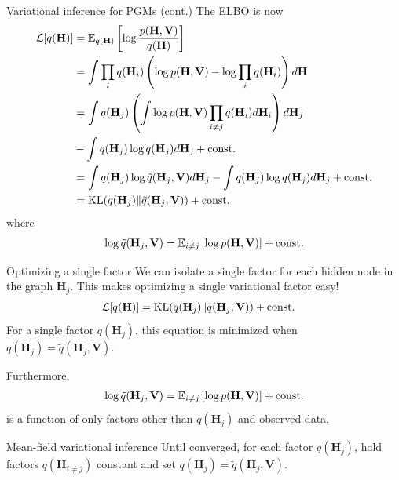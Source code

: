 \documentclass[10pt, compress]{beamer}
\begin{document}
\begin{frame}{Variational inference for PGMs (cont.)}
	The ELBO is now
	\begin{align*}
		\mathcal{L}[q(\mathbf{H})] &= \mathbb{E}_{q(\mathbf{H})} \left[\log\frac{p(\mathbf{H}, \mathbf{V})}{q(\mathbf{H})}\right] \\
											&= \int\prod_i q(\mathbf{H}_i) \left(\log p(\mathbf{H}, \mathbf{V}) - \log \prod_i q(\mathbf{H}_i)\right)d\mathbf{H}\\
											&= \int q(\mathbf{H}_j) \left(\int \log p(\mathbf{H}, \mathbf{V})\prod_{i \neq j}q(\mathbf{H}_i)d\mathbf{H}_i \right)d\mathbf{H}_j \\&- \int q(\mathbf{H}_j)\log q(\mathbf{H}_j)d \mathbf{H}_j + \textrm{const.}\\
											&= \int q(\mathbf{H}_j)\log \tilde{q}(\mathbf{H}_j, \mathbf{V})d \mathbf{H}_j- \int q(\mathbf{H}_j)\log q(\mathbf{H}_j)d \mathbf{H}_j  + \textrm{const.} \\
											&= \textrm{KL}(q(\mathbf{H}_j)\|\tilde{q}(\mathbf{H}_j, \mathbf{V}))  + \textrm{const.}
	\end{align*}
	where 
	\begin{align*}
		\log\tilde{q}(\mathbf{H}_j, \mathbf{V}) = \mathbb{E}_{i \neq j}\left[\log p(\mathbf{H}, \mathbf{V})\right] + \textrm{const.}
	\end{align*}

\end{frame}

\begin{frame}{Optimizing a single factor}
	We can isolate a single factor for each hidden node in the graph $\mathbf{H}_j$.
	This makes optimizing a single variational factor easy!
	\pause
	\begin{align*}
		\mathcal{L}[q(\mathbf{H})] &= \textrm{KL}(q(\mathbf{H}_j)\|\tilde{q}(\mathbf{H}_j, \mathbf{V}))  + \textrm{const.}
	\end{align*}
	\pause
	For a single factor $q(\mathbf{H}_j)$, this equation is minimized
	when $q(\mathbf{H}_j) = \tilde{q}(\mathbf{H}_j, \mathbf{V})$.

	\pause
	Furthermore, 
	\begin{align*}
		\log\tilde{q}(\mathbf{H}_j, \mathbf{V}) = \mathbb{E}_{i \neq j}\left[\log p(\mathbf{H}, \mathbf{V})\right] + \textrm{const.}
	\end{align*}
	is a function of only factors other than $q(\mathbf{H}_j)$  and observed data.

	\pause
	\begin{block}{Mean-field variational inference}
		Until converged,
		for each factor $q(\mathbf{H}_j)$,
		hold factors $q(\mathbf{H}_{i \neq j})$ constant and
		set $q(\mathbf{H}_j) = \tilde{q}(\mathbf{H}_j, \mathbf{V})$.
	\end{block}
\end{frame}
\end{document}
